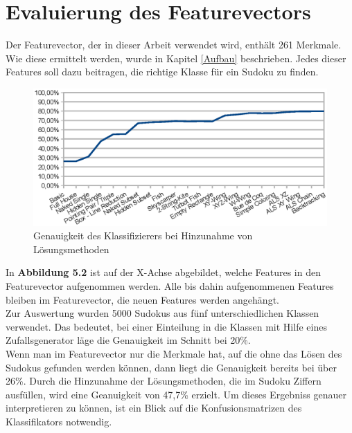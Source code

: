 \newpage
\section{Evaluierung des Featurevectors}
Der Featurevector, der in dieser Arbeit verwendet wird, enthält 261 Merkmale. Wie diese ermittelt werden, wurde in Kapitel \ref{Aufbau} beschrieben. Jedes dieser Features soll dazu beitragen, die richtige Klasse für ein Sudoku zu finden.\\

\begin{figure}[Hh]
    \includegraphics[width=\textwidth,height=\textheight,keepaspectratio]{./img/accuracy.eps}
    \caption{Genauigkeit des Klassifizierers bei Hinzunahme von Lösungsmethoden}
\end{figure}
\noindent In \textbf{Abbildung 5.2} ist auf der X-Achse abgebildet, welche Features in den Featurevector aufgenommen werden. Alle bis dahin aufgenommenen Features bleiben im Featurevector, die neuen Features werden angehängt.\\
Zur Auswertung wurden 5000 Sudokus aus fünf unterschiedlichen Klassen verwendet. Das bedeutet, bei einer Einteilung in die Klassen mit Hilfe eines Zufallsgenerator läge die Genauigkeit im Schnitt bei 20\%.\\
Wenn man im Featurevector nur die Merkmale hat, auf die ohne das Lösen des Sudokus gefunden werden können, dann liegt die Genauigkeit bereits bei über 26\%. Durch die Hinzunahme der Lösungsmethoden, die im Sudoku Ziffern ausfüllen, wird eine Geanuigkeit von 47,7\% erzielt. Um dieses Ergebniss genauer interpretieren zu können, ist ein Blick auf die Konfusionsmatrizen des Klassifikators notwendig.\\

